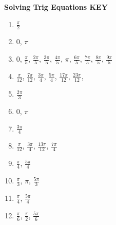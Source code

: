 \documentclass{article}
\begin{document}






\newpage

\textbf{Solving Trig Equations KEY}
\begin{enumerate}
    \item $\frac{\pi}{2}$
    \item $0$, $\pi$
    \item 0, $\frac{\pi}{5}$, $\frac{2\pi}{5}$, $\frac{3\pi}{5}$, $\frac{4\pi}{5}$, $\pi$, $\frac{6\pi}{5}$, $\frac{7\pi}{5}$, $\frac{8\pi}{5}$, $\frac{9\pi}{5}$
    \item $\frac{\pi}{12}$, $\frac{7\pi}{12}$, $\frac{3\pi}{4}$, $\frac{5\pi}{4}$, $\frac{17\pi}{12}$, $\frac{23\pi}{12}$,
    \item $\frac{2\pi}{3}$
    \item $0$, $\pi$
    \item $\frac{3\pi}{4}$
    \item $\frac{\pi}{12}$, $\frac{3\pi}{4}$, $\frac{13\pi}{12}$, $\frac{7\pi}{4}$
    \item $\frac{\pi}{4}$, $\frac{5\pi}{4}$
    \item $\frac{\pi}{3}$, $\pi$, $\frac{5\pi}{3}$
    \item $\frac{\pi}{4}$, $\frac{5\pi}{4}$
    \item $\frac{\pi}{6}$, $\frac{\pi}{2}$, $\frac{5\pi}{6}$
\end{enumerate}
\end{document}
